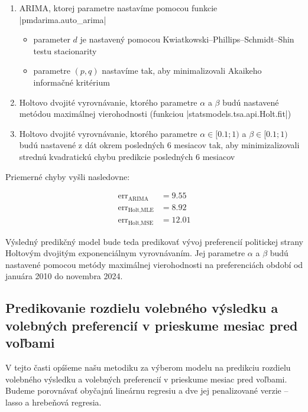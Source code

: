 \documentclass[report.tex]{subfiles}
\begin{document}
\begin{enumerate}
	\item ARIMA, ktorej parametre nastavíme pomocou funkcie \pyth|pmdarima.auto_arima|
	\begin{itemize}
		\item parameter $d$ je nastavený pomocou Kwiatkowski–Phillips–Schmidt–Shin testu stacionarity\\ 
		\item parametre $(p,q)$ nastavíme tak, aby minimalizovali Akaikeho informačné kritérium
	\end{itemize}
	\item Holtovo dvojité vyrovnávanie, ktorého parametre $\alpha$ a $\beta$ budú nastavené metódou maximálnej vierohodnosti (funkciou \pyth|statsmodels.tsa.api.Holt.fit|)
	\item Holtovo dvojité vyrovnávanie, ktorého parametre $\alpha \in [0.1;1) $ a $\beta \in [0.1;1)$ budú nastavené z dát okrem posledných 6 mesiacov tak, aby minimizalizovali strednú kvadratickú chybu predikcie posledných 6 mesiacov
\end{enumerate}

Priemerné chyby vyšli nasledovne:

\begin{align*}
	\operatorname{err}_{\operatorname{ARIMA}} &= 9.55 \\
	\operatorname{err}_{\operatorname{Holt, MLE}} &= 8.92 \\
	\operatorname{err}_{\operatorname{Holt, MSE}} &= 12.01
\end{align*}

Výsledný predikčný model bude teda predikovať vývoj preferencií politickej strany Holtovým dvojitým exponenciálnym vyrovnávaním. Jej parametre $\alpha$ a $\beta$ budú nastavené pomocou metódy maximálnej vierohodnosti na preferenciách období od januára 2010 do novembra 2024.


\subsection{Predikovanie rozdielu volebného výsledku a volebných preferencií v prieskume mesiac pred voľbami}

V tejto časti opíšeme našu metodiku za výberom modelu na predikciu rozdielu volebného výsledku a volebných preferencií v prieskume mesiac pred voľbami. Budeme porovnávať obyčajnú lineárnu regresiu a dve jej penalizované verzie -- lasso a hrebeňová regresia.
\end{document}
